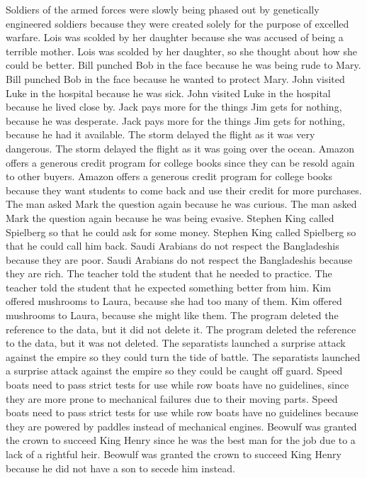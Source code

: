 \documentclass{article}
\begin{document}
\begin{enumerate}
	Soldiers of the armed forces were slowly being phased out by genetically engineered soldiers because they were created solely for the purpose of excelled warfare.
	Lois was scolded by her daughter because she was accused of being a terrible mother.
	Lois was scolded by her daughter, so she thought about how she could be better.
	Bill punched Bob in the face because he was being rude to Mary.
	Bill punched Bob in the face because he wanted to protect Mary.
	John visited Luke in the hospital because he was sick.
	John visited Luke in the hospital because he lived close by.
	Jack pays more for the things Jim gets for nothing, because he was desperate.
	Jack pays more for the things Jim gets for nothing, because he had it available.
	The storm delayed the flight as it was very dangerous.
	The storm delayed the flight as it was going over the ocean.
	Amazon offers a generous credit program for college books since they can be resold again to other buyers.
	Amazon offers a generous credit program for college books because they want students to come back and use their credit for more purchases.
	The man asked Mark the question again because he was curious.
	The man asked Mark the question again because he was being evasive.
	Stephen King called Spielberg so that he could ask for some money.
	Stephen King called Spielberg so that he could call him back.
	Saudi Arabians do not respect the Bangladeshis because they are poor.
	Saudi Arabians do not respect the Bangladeshis because they are rich.
	The teacher told the student that he needed to practice.
	The teacher told the student that he expected something better from him.
	Kim offered mushrooms to Laura, because she had too many of them.
	Kim offered mushrooms to Laura, because she might like them.
	The program deleted the reference to the data, but it did not delete it.
	The program deleted the reference to the data, but it was not deleted.
	The separatists launched a surprise attack against the empire so they could turn the tide of battle.
	The separatists launched a surprise attack against the empire so they could be caught off guard.
	Speed boats need to pass strict tests for use while row boats have no guidelines, since they are more prone to mechanical failures due to their moving parts.
	Speed boats need to pass strict tests for use while row boats have no guidelines because they are powered by paddles instead of mechanical engines.
	Beowulf was granted the crown to succeed King Henry since he was the best man for the job due to a lack of a rightful heir.
	Beowulf was granted the crown to succeed King Henry because he did not have a son to secede him instead.

\end{enumerate}
\end{document}
